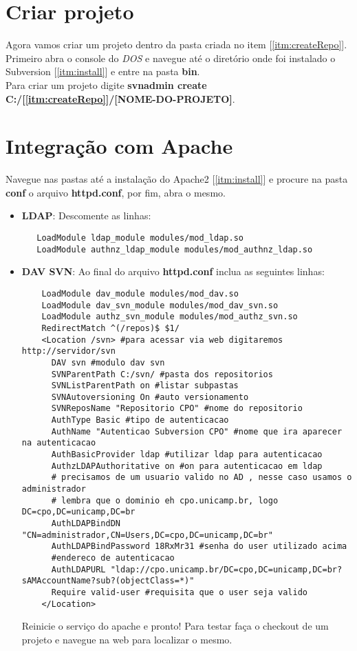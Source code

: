 \documentclass[a4paper,10pt]{article}
\begin{document}
\section{Criar projeto}
Agora vamos criar um projeto dentro da pasta criada no item [\ref{itm:createRepo}]. 
Primeiro abra o console do \emph{DOS} e navegue até o diretório onde foi instalado o Subversion [\ref{itm:install}] e entre na pasta \textbf{bin}.\\
Para criar um projeto digite \textbf{svnadmin create C:/[\ref{itm:createRepo}]/[NOME-DO-PROJETO]}.
\section{Integração com Apache}
Navegue nas pastas até a instalação do Apache2 [\ref{itm:install}] e procure na pasta \textbf{conf} o arquivo \textbf{httpd.conf}, por fim, abra o mesmo.
\begin{itemize}
\item \textbf{LDAP}: Descomente as linhas:
 \begin{lstlisting}
   LoadModule ldap_module modules/mod_ldap.so
   LoadModule authnz_ldap_module modules/mod_authnz_ldap.so
 \end{lstlisting}
\item \textbf{DAV SVN}: Ao final do arquivo \textbf{httpd.conf} inclua as seguintes linhas:
  \begin{lstlisting}
    LoadModule dav_module modules/mod_dav.so
    LoadModule dav_svn_module modules/mod_dav_svn.so
    LoadModule authz_svn_module modules/mod_authz_svn.so
    RedirectMatch ^(/repos)$ $1/
    <Location /svn> #para acessar via web digitaremos http://servidor/svn
      DAV svn #modulo dav svn
      SVNParentPath C:/svn/ #pasta dos repositorios
      SVNListParentPath on #listar subpastas
      SVNAutoversioning On #auto versionamento
      SVNReposName "Repositorio CPO" #nome do repositorio
      AuthType Basic #tipo de autenticacao
      AuthName "Autenticao Subversion CPO" #nome que ira aparecer na autenticacao
      AuthBasicProvider ldap #utilizar ldap para autenticacao
      AuthzLDAPAuthoritative on #on para autenticacao em ldap
      # precisamos de um usuario valido no AD , nesse caso usamos o administrador
      # lembra que o dominio eh cpo.unicamp.br, logo DC=cpo,DC=unicamp,DC=br
      AuthLDAPBindDN "CN=administrador,CN=Users,DC=cpo,DC=unicamp,DC=br" 
      AuthLDAPBindPassword 18RxMr31 #senha do user utilizado acima
      #endereco de autenticacao
      AuthLDAPURL "ldap://cpo.unicamp.br/DC=cpo,DC=unicamp,DC=br?sAMAccountName?sub?(objectClass=*)"
      Require valid-user #requisita que o user seja valido
    </Location>
  \end{lstlisting}
Reinicie o serviço do apache e pronto! Para testar faça o checkout de um projeto e navegue na web para localizar o mesmo.
\end{itemize}
\end{document}
